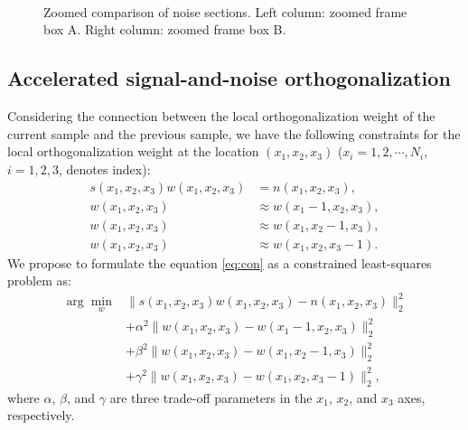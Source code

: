 \begin{figure}[htb!]
\centering
{}
   \\
   \\
   \\  
\caption{Zoomed comparison of noise sections. Left column: zoomed frame box A. Right column: zoomed frame box B.}
\label{fig:zoom-rnadif-a,zoom-rnadif-b,zoom-orthodif-a,zoom-orthodif-b,zoom-ortho2dif-a,zoom-ortho2dif-b}
\end{figure}



\subsection{Accelerated signal-and-noise orthogonalization}
Considering the connection between the local orthogonalization weight of the current sample and the previous sample, we have the following constraints for the local orthogonalization weight at the location $(x_1,x_2,x_3)$ ($x_i=1,2,\cdots,N_i$, $i=1,2,3$, denotes index):
\begin{equation}
\label{eq:con}
\begin{split}
s(x_1,x_2,x_3) w(x_1,x_2,x_3) &= n(x_1,x_2,x_3), \\
 w(x_1,x_2,x_3) &\approx w(x_1-1,x_2,x_3), \\
 w(x_1,x_2,x_3) &\approx w(x_1,x_2-1,x_3), \\
 w(x_1,x_2,x_3) &\approx w(x_1,x_2,x_3-1). 
\end{split}
\end{equation}
We propose to formulate the equation \ref{eq:con} as a constrained least-squares problem as:
\begin{equation}
\label{eq:con1}
\begin{split}
\arg \min_w &\parallel s(x_1,x_2,x_3) w(x_1,x_2,x_3)-n(x_1,x_2,x_3) \parallel_2^2 \\
&+\alpha^2 \parallel w(x_1,x_2,x_3)- w(x_1-1,x_2,x_3) \parallel_2^2  \\
&+ \beta^2 \parallel w(x_1,x_2,x_3)- w(x_1,x_2-1,x_3) \parallel_2^2  \\
&+ \gamma^2 \parallel w(x_1,x_2,x_3)- w(x_1,x_2,x_3-1) \parallel_2^2,
\end{split}
\end{equation}
where $\alpha$, $ \beta$, and $\gamma$ are three trade-off parameters in the $x_1$, $x_2$, and $x_3$ axes, respectively.

